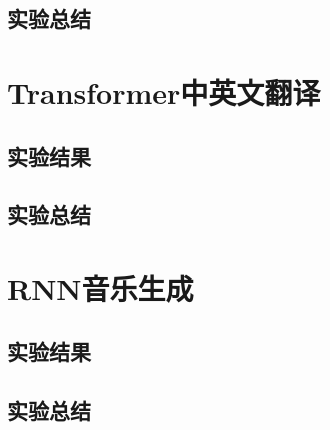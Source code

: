 \documentclass{ds201}
\begin{document}
\subsection{实验总结}

\section{Transformer中英文翻译}

\subsection{实验结果}

\subsection{实验总结}

\section{RNN音乐生成}

\subsection{实验结果}

\subsection{实验总结}
\end{document}
